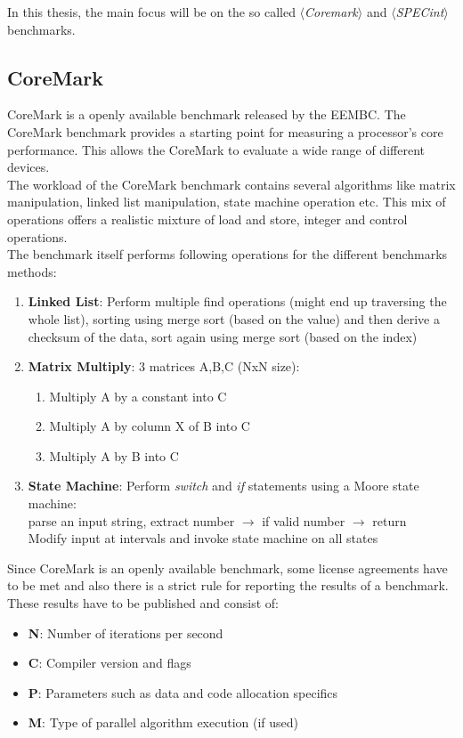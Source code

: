  In this thesis, the main focus will be on the so called $\langle$\textit{Coremark}$\rangle$ and $\langle$\textit{SPECint}$\rangle$ benchmarks.
\subsection{CoreMark}
CoreMark is a openly available benchmark released by the \ac{EEMBC}. The CoreMark benchmark provides a starting point for measuring a processor's core performance. This allows the CoreMark to evaluate a wide range of different devices.\\
The workload of the CoreMark benchmark contains several algorithms like matrix manipulation, linked list manipulation, state machine operation etc. This mix of operations offers a realistic mixture of load and store, integer and control operations.\\
The benchmark itself performs following operations for the different benchmarks methods:
\begin{enumerate}
	\item \textbf{Linked List}: Perform multiple find operations (might end up traversing the whole list), sorting using merge sort (based on the value) and then derive a checksum of the data, sort again using merge sort (based on the index)
	\item \textbf{Matrix Multiply}: 3 matrices A,B,C (NxN size): 
	\begin{enumerate}
		\item Multiply A by a constant into C
		\item Multiply A by column X of B into C
		\item Multiply A by B into C
	\end{enumerate}
	\item \textbf{State Machine}: Perform \textit{switch} and \textit{if} statements using a Moore state machine:\\
	parse an input string, extract number $\rightarrow$ if valid number $\rightarrow$ return\\
	Modify input at intervals and invoke state machine on all states
\end{enumerate}
Since CoreMark is an openly available benchmark, some license agreements have to be met and also there is a strict rule for reporting the results of a benchmark. These results have to be published and consist of:
\begin{itemize}
	\item \textbf{N}: Number of iterations per second
	\item \textbf{C}: Compiler version and flags
	\item \textbf{P}: Parameters such as data and code allocation specifics
	\item \textbf{M}: Type of parallel algorithm execution (if used)
\end{itemize}
